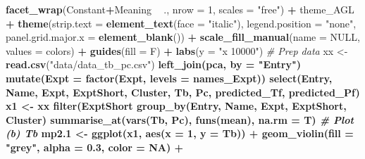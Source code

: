 \documentclass[
]{article}
\newenvironment{Shaded}{\begin{snugshade}}{\end{snugshade}}
\newcommand{\CommentTok}[1]{\textcolor[rgb]{0.56,0.35,0.01}{\textit{#1}}}
\newcommand{\DataTypeTok}[1]{\textcolor[rgb]{0.13,0.29,0.53}{#1}}
\newcommand{\DecValTok}[1]{\textcolor[rgb]{0.00,0.00,0.81}{#1}}
\newcommand{\FloatTok}[1]{\textcolor[rgb]{0.00,0.00,0.81}{#1}}
\newcommand{\KeywordTok}[1]{\textcolor[rgb]{0.13,0.29,0.53}{\textbf{#1}}}
\newcommand{\NormalTok}[1]{#1}
\newcommand{\OperatorTok}[1]{\textcolor[rgb]{0.81,0.36,0.00}{\textbf{#1}}}
\newcommand{\OtherTok}[1]{\textcolor[rgb]{0.56,0.35,0.01}{#1}}
\newcommand{\StringTok}[1]{\textcolor[rgb]{0.31,0.60,0.02}{#1}}
\begin{document}
\begin{Shaded}
\begin{Highlighting}[]
{{{{{{\StringTok{  }\KeywordTok{facet_wrap}\NormalTok{(Constant}\OperatorTok{+}\NormalTok{Meaning }\OperatorTok{~}\StringTok{ }\NormalTok{., }\DataTypeTok{nrow =} \DecValTok{1}\NormalTok{, }\DataTypeTok{scales =} \StringTok{"free"}\NormalTok{) }\OperatorTok{+}\StringTok{ }
\StringTok{  }\NormalTok{theme_AGL }\OperatorTok{+}
\StringTok{  }\KeywordTok{theme}\NormalTok{(}\DataTypeTok{strip.text =} \KeywordTok{element_text}\NormalTok{(}\DataTypeTok{face =} \StringTok{"italic"}\NormalTok{),}
        \DataTypeTok{legend.position =} \StringTok{"none"}\NormalTok{, }\DataTypeTok{panel.grid.major.x =} \KeywordTok{element_blank}\NormalTok{()) }\OperatorTok{+}
\StringTok{  }\KeywordTok{scale_fill_manual}\NormalTok{(}\DataTypeTok{name =} \OtherTok{NULL}\NormalTok{, }\DataTypeTok{values =}\NormalTok{ colors) }\OperatorTok{+}
\StringTok{  }\KeywordTok{guides}\NormalTok{(}\DataTypeTok{fill =}\NormalTok{ F) }\OperatorTok{+}
\StringTok{  }\KeywordTok{labs}\NormalTok{(}\DataTypeTok{y =} \StringTok{"x 10000"}\NormalTok{)}
\CommentTok{# Prep data}
\NormalTok{xx <-}\StringTok{ }\KeywordTok{read.csv}\NormalTok{(}\StringTok{"data/data_tb_pc.csv"}\NormalTok{) }\OperatorTok{%
\StringTok{  }\KeywordTok{left_join}\NormalTok{(pca, }\DataTypeTok{by =} \StringTok{"Entry"}\NormalTok{) }\OperatorTok{%
\StringTok{  }\KeywordTok{mutate}\NormalTok{(}\DataTypeTok{Expt =} \KeywordTok{factor}\NormalTok{(Expt, }\DataTypeTok{levels =}\NormalTok{ names_Expt)) }\OperatorTok{%
\StringTok{  }\KeywordTok{select}\NormalTok{(Entry, Name, Expt, ExptShort, Cluster, Tb, Pc, predicted_Tf, predicted_Pf)}
\NormalTok{x1 <-}\StringTok{ }\NormalTok{xx }\OperatorTok{%
\StringTok{  }\KeywordTok{filter}\NormalTok{(ExptShort }\OperatorTok{%
\StringTok{  }\KeywordTok{group_by}\NormalTok{(Entry, Name, Expt, ExptShort, Cluster) }\OperatorTok{%
\StringTok{  }\KeywordTok{summarise_at}\NormalTok{(}\KeywordTok{vars}\NormalTok{(Tb, Pc), }\KeywordTok{funs}\NormalTok{(mean), }\DataTypeTok{na.rm =}\NormalTok{ T) }
\CommentTok{# Plot (b) Tb}
\NormalTok{mp2}\FloatTok{.1}\NormalTok{ <-}\StringTok{ }\KeywordTok{ggplot}\NormalTok{(x1, }\KeywordTok{aes}\NormalTok{(}\DataTypeTok{x =} \DecValTok{1}\NormalTok{, }\DataTypeTok{y =}\NormalTok{ Tb)) }\OperatorTok{+}\StringTok{ }
\StringTok{  }\KeywordTok{geom_violin}\NormalTok{(}\DataTypeTok{fill =} \StringTok{"grey"}\NormalTok{, }\DataTypeTok{alpha =} \FloatTok{0.3}\NormalTok{, }\DataTypeTok{color =} \OtherTok{NA}\NormalTok{) }\OperatorTok{+}\StringTok{ }
}}}}}}}}}}}}
\end{Highlighting}
\end{Shaded}
\end{document}

